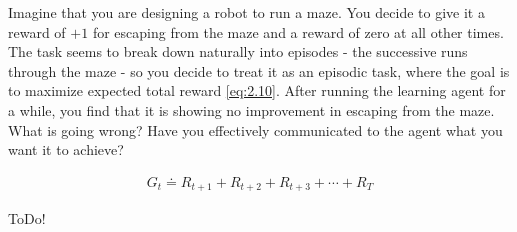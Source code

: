 
\begin{exercise}[Exercise 3.7]

Imagine that you are designing a robot to run a maze.
You decide to give it a reward of $+1$ for escaping from the maze and a reward of zero at all other times.
The task seems to break down naturally into episodes - the successive runs through the maze - so you decide to treat it as an episodic task, where the goal is to maximize expected total reward \eqref{eq:2.10}.
After running the learning agent for a while, you find that it is showing no improvement in escaping from the maze.
What is going wrong?
Have you effectively communicated to the agent what you want it to achieve?

\begin{align} \label{eq:2.10}
    G_t \doteq R_{t+1} + R_{t+2} + R_{t+3} + \cdots + R_T
\end{align}

\end{exercise}


\begin{solution}

ToDo!

\end{solution}

